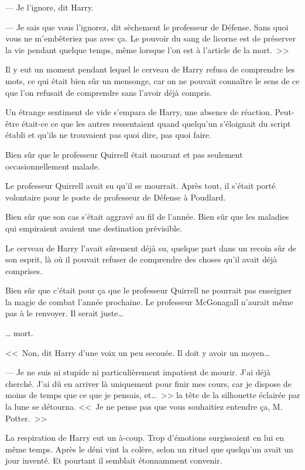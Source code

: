 --- Je l'ignore, dit Harry.

--- Je sais que vous l'ignorez, dit sèchement le professeur de Défense. Sans quoi vous ne m'embêteriez pas avec ça. Le pouvoir du sang de licorne est de préserver la vie pendant quelque temps, même lorsque l'on est à l'article de la mort.~>>

Il y eut un moment pendant lequel le cerveau de Harry refusa de comprendre les mots, ce qui était bien sûr un mensonge, car on ne pouvait connaître le sens de ce que l'on refusait de comprendre sans l'avoir déjà compris.

Un étrange sentiment de vide s'empara de Harry, une absence de réaction. Peut-être était-ce ce que les autres ressentaient quand quelqu'un s'éloignait du script établi et qu'ils ne trouvaient pas quoi dire, pas quoi faire.

Bien sûr que le professeur Quirrell était mourant et pas seulement occasionnellement malade.

Le professeur Quirrell avait su qu'il se mourrait. Après tout, il s'était porté volontaire pour le poste de professeur de Défense à Poudlard.

Bien sûr que son cas s'était aggravé au fil de l'année. Bien sûr que les maladies qui empiraient avaient une destination prévisible.

Le cerveau de Harry l'avait sûrement déjà su, quelque part dans un recoin sûr de son esprit, là où il pouvait refuser de comprendre des choses qu'il avait déjà comprises.

Bien sûr que c'était pour ça que le professeur Quirrell ne pourrait pas enseigner la magie de combat l'année prochaine. Le professeur McGonagall n'aurait même pas à le renvoyer. Il serait juste…

… mort.

<<~Non, dit Harry d'une voix un peu secouée. Il doit y avoir un moyen…

--- Je ne suis ni stupide ni particulièrement impatient de mourir. J'ai déjà cherché. J'ai dû en arriver là uniquement pour finir mes cours, car je dispose de moins de temps que ce que je pensais, et…~>> la tête de la silhouette éclairée par la lune se détourna. <<~Je ne pense pas que vous souhaitiez entendre ça, M. Potter.~>>

La respiration de Harry eut un à-coup. Trop d'émotions surgissaient en lui en même temps. Après le déni vint la colère, selon un rituel que quelqu'un avait un jour inventé. Et pourtant il semblait étonnamment convenir.

